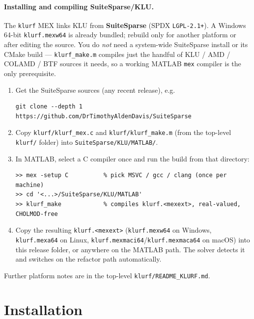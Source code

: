 \documentclass[11pt,a4paper]{article}
\newcommand{\code}[1]{\texttt{#1}}
\begin{document}
\paragraph{Installing and compiling SuiteSparse/KLU.}
The \code{klurf} MEX links KLU from \textbf{SuiteSparse} (SPDX \code{LGPL-2.1+}). A Windows
64-bit \code{klurf.mexw64} is already bundled; rebuild only for another platform or after
editing the source. You do \emph{not} need a system-wide SuiteSparse install or its CMake
build --- \code{klurf_make.m} compiles just the handful of KLU / AMD / COLAMD / BTF sources
it needs, so a working MATLAB \code{mex} compiler is the only prerequisite.
\begin{enumerate}[leftmargin=1.6em]
  \item Get the SuiteSparse sources (any recent release), e.g.
\begin{lstlisting}[style=sh]
git clone --depth 1 https://github.com/DrTimothyAldenDavis/SuiteSparse
\end{lstlisting}
  \item Copy \code{klurf/klurf_mex.c} and \code{klurf/klurf_make.m} (from the top-level
        \code{klurf/} folder) into \code{SuiteSparse/KLU/MATLAB/}.
  \item In MATLAB, select a C compiler once and run the build from that directory:
\begin{lstlisting}[style=mat]
>> mex -setup C          % pick MSVC / gcc / clang (once per machine)
>> cd '<...>/SuiteSparse/KLU/MATLAB'
>> klurf_make            % compiles klurf.<mexext>, real-valued, CHOLMOD-free
\end{lstlisting}
  \item Copy the resulting \code{klurf.<mexext>} (\code{klurf.mexw64} on Windows,
        \code{klurf.mexa64} on Linux, \code{klurf.mexmaci64}/\code{klurf.mexmaca64} on macOS)
        into this release folder, or anywhere on the MATLAB path. The solver detects it and
        switches on the refactor path automatically.
\end{enumerate}
Further platform notes are in the top-level \code{klurf/README_KLURF.md}.

\section{Installation}
\end{document}
